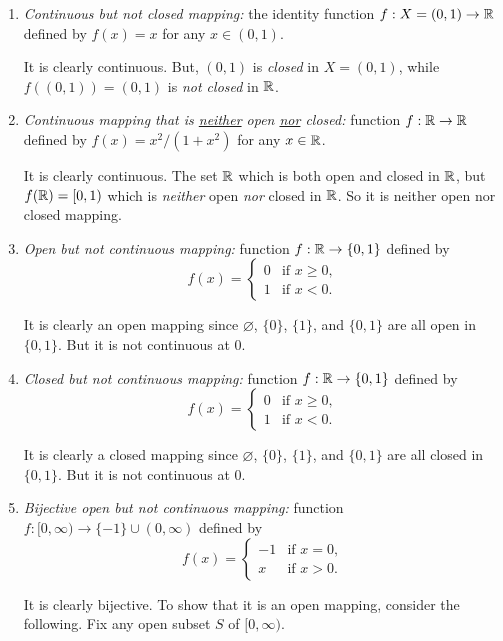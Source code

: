 \begin{enumerate}
\begin{enumerate}
\item \emph{Continuous but not closed mapping:} the identity function
\(f:X=(0,1)\to\mathbb{R}\) defined by \(f(x)=x\) for any \(x\in(0,1)\).

\begin{pf}
It is clearly continuous. But, \((0,1)\) is \emph{closed} in
\(X=(0,1)\), while \(f((0,1))=(0,1)\) is \emph{not closed} in \(\mathbb{R}\).
\end{pf}

\item \emph{Continuous mapping that is \underline{neither} open \underline{nor}
closed:} function \(f:\mathbb{R}\to\mathbb{R}\) defined by \(f(x)=x^2/(1+x^2)\) for any
\(x\in\mathbb{R}\).

\begin{pf}
It is clearly continuous. The set \(\mathbb{R}\) which is both open and closed in
\(\mathbb{R}\), but \(f(\mathbb{R})=[0,1)\) which is \emph{neither} open \emph{nor} closed in
\(\mathbb{R}\). So it is neither open nor closed mapping.
\end{pf}

\item \emph{Open but not continuous mapping:} function \(f:\mathbb{R}\to\{0,1\}\) defined by
\[
f(x)=\begin{cases}
0&\text{if \(x\ge 0\)},\\
1&\text{if \(x<0\)}.
\end{cases}
\]
\begin{pf}
It is clearly an open mapping since \(\varnothing\), \(\{0\}\), \(\{1\}\), and
\(\{0,1\}\) are all open in \(\{0,1\}\).  But it is not continuous at \(0\).
\end{pf}

\item \emph{Closed but not continuous mapping:} function \(f:\mathbb{R}\to\{0,1\}\) defined by
\[
f(x)=\begin{cases}
0&\text{if \(x\ge 0\)},\\
1&\text{if \(x<0\)}.
\end{cases}
\]
\begin{pf}
It is clearly a closed mapping since \(\varnothing\), \(\{0\}\), \(\{1\}\), and
\(\{0,1\}\) are all closed in \(\{0,1\}\).  But it is not continuous at \(0\).
\end{pf}

\item \emph{Bijective open but not continuous mapping:} function
\(f:[0,\infty)\to\{-1\}\cup(0,\infty)\) defined by
\[
f(x)=\begin{cases}
-1&\text{if \(x=0\)},\\
x&\text{if \(x>0\)}.
\end{cases}
\]
\begin{pf}
It is clearly bijective. To show that it is an open mapping, consider the
following. Fix any open subset \(S\) of \([0,\infty)\).


\end{pf}
\end{enumerate}
\end{enumerate}
